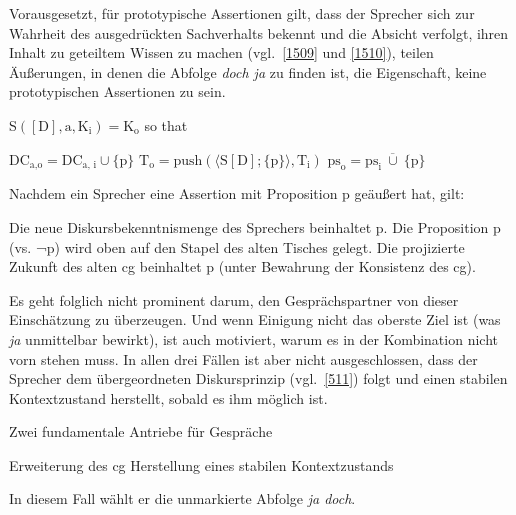 Vorausgesetzt, für prototypische Assertionen gilt, dass der Sprecher sich zur Wahrheit des ausgedrückten Sachverhalts bekennt und die Absicht verfolgt, ihren Inhalt zu geteiltem Wissen zu machen (vgl.\ \ref{1509} und \ref{1510}), teilen Äußerungen, in denen die Abfolge \textit{doch ja} zu finden ist, die Eigenschaft, keine prototypischen Assertionen zu sein.

\begin{exe}
	\ex\label{1509} 
		S$([\textrm{D}], \textrm{a}, \textrm{K}_{\textrm{i}}) = \textrm{K}_{\textrm{o}}$ so that
		\begin{xlist}	
			\ex\label{1509a} $\textrm{DC}_{\textrm{a,o}} = \textrm{DC}_{\textrm{a, i}} \cup \lbrace\textrm{p}\rbrace$
			\ex\label{1509b} $\textrm{T}_{\textrm{o}} = \textrm{push}(\langle \textrm{S}[\textrm{D}]; \lbrace \textrm{p} \rbrace \rangle, \textrm{T}_{\textrm{i}})$
			\ex\label{1509c} $\textrm{ps}_{\textrm{o}} = \textrm{ps}_{\textrm{i}} \ \overline\cup \ \lbrace \textrm{p} \rbrace$
			\hfill\hbox{\citet[92]{Farkas2010}}
		\end{xlist}
\end{exe}

\begin{exe}
	\ex\label{1510} 
	Nachdem ein Sprecher eine Assertion mit Proposition p geäußert hat, gilt:
		\begin{xlist}	
			\ex\label{1510a} Die neue Diskursbekenntnismenge des Sprechers beinhaltet p.
			\ex\label{1510b} Die Proposition p (vs. ¬p) wird oben auf den Stapel des alten Tisches gelegt.
			\ex\label{1510c} Die projizierte Zukunft des alten cg beinhaltet p (unter Bewahrung der Konsistenz des cg).
		\end{xlist}
\end{exe}
Es geht folglich nicht prominent darum, den Gesprächspartner von dieser Einschätzung zu überzeugen. Und wenn Einigung nicht das oberste Ziel ist (was \textit{ja} unmittelbar bewirkt), ist auch motiviert, warum es in der Kombination nicht vorn stehen muss. In allen drei Fällen ist aber nicht ausgeschlossen, dass der Sprecher dem übergeordneten Diskursprinzip (vgl.\ \ref{511}) folgt und einen stabilen Kontextzustand herstellt, sobald es ihm möglich ist. 

\begin{exe}
	\ex\label{511} Zwei fundamentale Antriebe für Gespräche
		\begin{xlist}	
			\ex\label{511a} Erweiterung des cg
			\ex\label{511b} Herstellung eines stabilen Kontextzustands\\
			\hbox{}\hfill\hbox{\citet[87]{Farkas2010}}
		\end{xlist}
\end{exe}
In diesem Fall wählt er die unmarkierte Abfolge \textit{ja doch}.
								         
